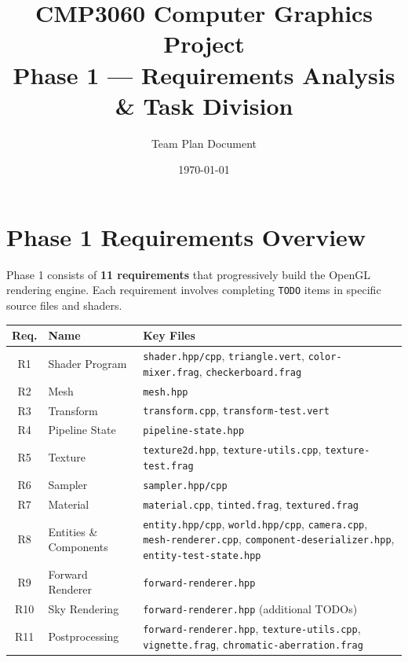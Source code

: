 \documentclass[12pt,a4paper]{article}
\title{%
  \vspace{-1cm}
  \textbf{CMP3060 Computer Graphics Project}\\[6pt]
  \Large Phase 1 --- Requirements Analysis \& Task Division
}
\author{Team Plan Document}
\date{\today}
\begin{document}
\maketitle
\thispagestyle{fancy}

\section{Phase 1 Requirements Overview}

Phase 1 consists of \textbf{11 requirements} that progressively build the OpenGL rendering engine. Each requirement involves completing \texttt{TODO} items in specific source files and shaders.

\begin{center}
\renewcommand{\arraystretch}{1.3}
\begin{tabular}{c l p{7.5cm}}
\toprule
\textbf{Req.} & \textbf{Name} & \textbf{Key Files} \\
\midrule
R1 & Shader Program &
  \texttt{shader.hpp/cpp}, \texttt{triangle.vert},
  \texttt{color-mixer.frag}, \texttt{checkerboard.frag} \\
R2 & Mesh &
  \texttt{mesh.hpp} \\
R3 & Transform &
  \texttt{transform.cpp}, \texttt{transform-test.vert} \\
R4 & Pipeline State &
  \texttt{pipeline-state.hpp} \\
R5 & Texture &
  \texttt{texture2d.hpp}, \texttt{texture-utils.cpp},
  \texttt{texture-test.frag} \\
R6 & Sampler &
  \texttt{sampler.hpp/cpp} \\
R7 & Material &
  \texttt{material.cpp}, \texttt{tinted.frag},
  \texttt{textured.frag} \\
R8 & Entities \& Components &
  \texttt{entity.hpp/cpp}, \texttt{world.hpp/cpp},
  \texttt{camera.cpp}, \texttt{mesh-renderer.cpp},
  \texttt{component-deserializer.hpp},
  \texttt{entity-test-state.hpp} \\
R9 & Forward Renderer &
  \texttt{forward-renderer.hpp} \\
R10 & Sky Rendering &
  \texttt{forward-renderer.hpp} (additional TODOs) \\
R11 & Postprocessing &
  \texttt{forward-renderer.hpp}, \texttt{texture-utils.cpp},
  \texttt{vignette.frag}, \texttt{chromatic-aberration.frag} \\
\bottomrule
\end{tabular}
\end{center}
\end{document}
